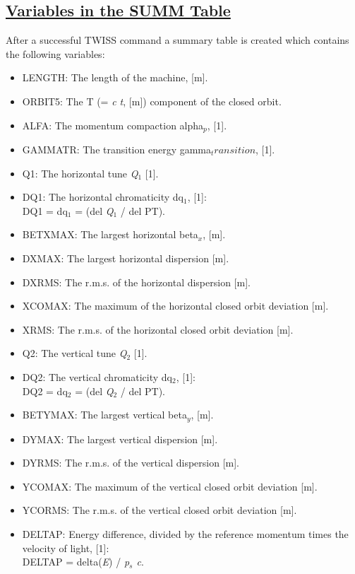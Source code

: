 \subsection{\href{summ}{Variables in the SUMM Table}} 
\label{subsec:tables_summ}
After a successful TWISS command a summary table is created which
contains the following variables:  
\begin{itemize}
   \item LENGTH: The length of the machine, [m].     
   \item ORBIT5: The T (= \textit{c t}, [m]) component of the closed orbit.     
   \item ALFA: The momentum compaction alpha$_p$, [1].     
   \item GAMMATR: The transition energy gamma$_transition$, [1].     
   \item Q1: The horizontal tune \textit{Q$_1$} [1].     
   \item DQ1: The horizontal chromaticity dq$_\textit{1}$, [1]:\\     
     DQ1 = dq$_\textit{1}$ = (del \textit{Q$_1$} / del PT).     
   \item BETXMAX: The largest horizontal beta$_\textit{x}$, [m].     
   \item DXMAX: The largest horizontal dispersion [m].     
   \item DXRMS: The r.m.s. of the horizontal dispersion [m].     
   \item XCOMAX: The maximum of the horizontal closed orbit deviation [m].     
   \item XRMS: The r.m.s. of the horizontal closed orbit deviation [m].     
   \item Q2: The vertical tune \textit{Q$_2$} [1].     
   \item DQ2: The vertical chromaticity dq$_\textit{2}$, [1]:\\     
     DQ2 = dq$_\textit{2}$ = (del \textit{Q$_2$} / del PT).     
   \item BETYMAX: The largest vertical beta$_\textit{y}$, [m].     
   \item DYMAX: The largest vertical dispersion [m].     
   \item DYRMS: The r.m.s. of the vertical dispersion [m].     
   \item YCOMAX: The maximum of the vertical closed orbit deviation [m].     
   \item YCORMS: The r.m.s. of the vertical closed orbit deviation [m].     
   \item DELTAP: Energy difference, divided by the reference
     momentum times the velocity of light, [1]:\\
     DELTAP = delta(\textit{E}) / \textit{p$_s$ c}.
\end{itemize} 

